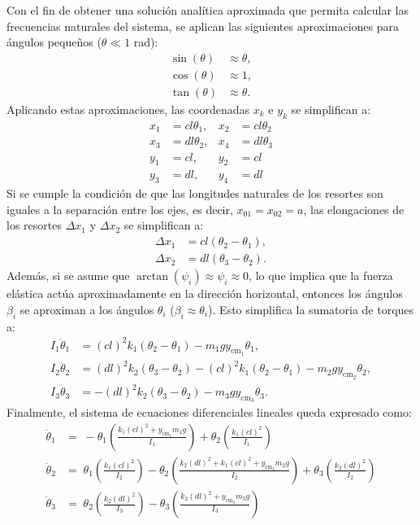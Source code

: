 Con el fin de obtener una soluci\'on anal\'itica aproximada que permita
calcular las frecuencias naturales del sistema, se aplican
las siguientes aproximaciones para \'angulos peque\~nos ($\theta \ll 1$ rad):
\begin{align*}
  \sin(\theta) &\approx \theta, \\
  \cos(\theta) &\approx 1, \\
  \tan(\theta) &\approx \theta.
\end{align*}
Aplicando estas aproximaciones, las coordenadas $x_k$ e $y_k$ se
simplifican a:
\begin{align*}
  x_1 &= c l \theta_1, & x_2 &= c l \theta_2 \\
  x_3 &= d l \theta_2, & x_4 &= d l \theta_3 \\
  y_1 &= c l, & y_2 &= c l \\
  y_3 &= d l, & y_4 &= d l
\end{align*}
Si se cumple la condici\'on de que las longitudes naturales de los
resortes son iguales a la separaci\'on entre los ejes, es decir,
$x_{01} = x_{02} = a$, las elongaciones de los resortes $\Delta x_1$
y $\Delta x_2$ se simplifican a:
\begin{align}
  \Delta x_1 &= cl(\theta_2 - \theta_1) \label{eq:deltax1_approx}, \\
  \Delta x_2 &= dl(\theta_3 - \theta_2) \label{eq:deltax2_approx}.
\end{align}
Adem\'as, si se asume que $\arctan(\psi_i) \approx \psi_i \approx 0$,
lo que implica que la fuerza el\'astica act\'ua aproximadamente en
la direcci\'on horizontal, entonces los \'angulos $\beta_i$ se
aproximan a los \'angulos $\theta_i$ ($\beta_i \approx \theta_i$).
Esto simplifica la sumatoria de torques a:
\begin{align}
  I_1 \ddot{\theta}_1 &= (cl)^2 k_1 (\theta_2 - \theta_1) - m_1 g y_{\text{cm}_1} \theta_1 \label{eq:eq_mov_lin1}, \\
  I_2 \ddot{\theta}_2 &= (dl)^2 k_2 (\theta_3 - \theta_2) - (cl)^2 k_1 (\theta_2 - \theta_1) - m_2 g y_{\text{cm}_2} \theta_2 \label{eq:eq_mov_lin2}, \\
  I_3 \ddot{\theta}_3 &= -(dl)^2 k_2 (\theta_3 - \theta_2) - m_3 g y_{\text{cm}_3} \theta_3 \label{eq:eq_mov_lin3}.
\end{align}
Finalmente, el sistema de ecuaciones diferenciales lineales queda
expresado como:
\begin{align}
  \ddot{\theta}_1 &=\; -\theta_1 \left( \frac{k_1 (cl)^2 + y_{\text{cm}_1} m_1 g}{I_1} \right) + \theta_2 \left( \frac{k_1 (cl)^2}{I_1} \right) \label{eq:eom1} \\
  \ddot{\theta}_2 &=\; \theta_1 \left( \frac{k_1 (cl)^2}{I_2} \right) - \theta_2 \left( \frac{k_2 (dl)^2 + k_1 (cl)^2 + y_{\text{cm}_2} m_2 g}{I_2} \right) + \theta_3 \left( \frac{k_2 (dl)^2}{I_2} \right) \label{eq:eom2} \\
  \ddot{\theta}_3 &=\; \theta_2 \left( \frac{k_2 (dl)^2}{I_3} \right) - \theta_3 \left( \frac{k_2 (dl)^2 + y_{\text{cm}_3} m_3 g}{I_3} \right) \label{eq:eom3}
\end{align}
